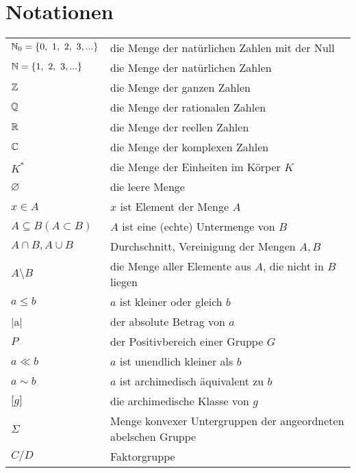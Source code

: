 \clearpage
\thispagestyle{empty}

\chapter{Notationen}

\begin{center}
\begin{tabular}{ll}
  $\mathbb{N}_0 = \lbrace 0,~1,~2,~3,...\rbrace$ & die Menge der natürlichen Zahlen mit der Null	\\
  $\mathbb{N} = \lbrace 1,~2,~3,...\rbrace$ & die Menge der natürlichen Zahlen \\
  $\mathbb{Z}$ & die Menge der ganzen Zahlen\\
  $\mathbb{Q}$ & die Menge der rationalen Zahlen\\
  $\mathbb{R}$ & die Menge der reellen Zahlen\\
  $\mathbb{C}$ & die Menge der komplexen Zahlen\\
  $K^*$& die Menge der Einheiten im Körper $K$\\
  $\varnothing$ & die leere Menge \\
  $x \in A$ & $x$ ist Element der Menge $A$\\
  $A\subseteq B (A \subset B)$& $A$ ist eine (echte) Untermenge von $B$ \\
  $A \cap B, A \cup B$ & Durchschnitt, Vereinigung der Mengen $A, B$\\
  $A \setminus B$ & die Menge aller Elemente aus $A$, die nicht in $B$ liegen \\
  $ a \leq b$ & $a$ ist kleiner oder gleich $b$\\
  |a| & der absolute Betrag von $a$\\
  $P$ & der Positivbereich einer Gruppe $G$ \\
  $a \ll b$ & $a$ ist unendlich kleiner als $b$\\
  $a \sim b$ & $a$ ist archimedisch äquivalent zu $b$\\
 $\lbrack g\rbrack$ & die archimedische Klasse von $g$\\
  $\Sigma$ & Menge konvexer Untergruppen der angeordneten abelschen Gruppe\\
  $C/D$ & Faktorgruppe\\
 \end{tabular}
\end{center}